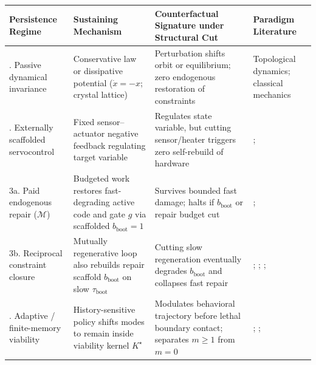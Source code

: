 \documentclass[11pt,a4paper]{article}
\newcounter{none}
\begin{document}
{\def\LTcaptype{none} %
\begin{longtable}[]{@{}
  >{\raggedright\arraybackslash}p{}
  >{\raggedright\arraybackslash}p{}
  >{\raggedright\arraybackslash}p{}
  >{\raggedright\arraybackslash}p{}@{}}
\toprule\noalign{}
\begin{minipage}[b]{\linewidth}\raggedright
Persistence Regime
\end{minipage} & \begin{minipage}[b]{\linewidth}\raggedright
Sustaining Mechanism
\end{minipage} & \begin{minipage}[b]{\linewidth}\raggedright
Counterfactual Signature under Structural Cut
\end{minipage} & \begin{minipage}[b]{\linewidth}\raggedright
Paradigm Literature
\end{minipage} \\
\midrule\noalign{}
\endhead
\bottomrule\noalign{}
\endlastfoot
1. Passive dynamical invariance & Conservative law or dissipative
potential (\(\dot{x}=-x\); crystal lattice) & Perturbation shifts orbit
or equilibrium; zero endogenous restoration of constraints & Topological
dynamics; classical mechanics \\
2. Externally scaffolded servocontrol & Fixed sensor--actuator negative
feedback regulating target variable & Regulates state variable, but
cutting sensor/heater triggers zero self-rebuild of hardware &
\citet{rosenblueth1943}; \citet{conantAshby1970} \\
3a. Paid endogenous repair (\(\mathcal{M}\)) & Budgeted work restores
fast-degrading active code and gate \(g\) via scaffolded
\(b_{\mathrm{boot}}=1\) & Survives bounded fast damage; halts if
\(b_{\mathrm{boot}}\) or repair budget cut & \citet{vonNeumann1966};
\citet{auWelshModrich1992} \\
3b. Reciprocal constraint closure & Mutually regenerative loop also
rebuilds repair scaffold \(b_{\mathrm{boot}}\) on slow
\(\tau_{\mathrm{boot}}\) & Cutting slow regeneration eventually degrades
\(b_{\mathrm{boot}}\) and collapses fast repair & \citet{kant1790};
\citet{varela1974}; \citet{rosen1991}; \citet{montevilMossio2015} \\
4. Adaptive / finite-memory viability & History-sensitive policy shifts
modes to remain inside viability kernel \(K^\star\) & Modulates
behavioral trajectory before lethal boundary contact; separates
\(m \ge 1\) from \(m=0\) & \citet{aubinCellina1984};
\citet{diPaolo2005}; \citet{bich2024} \\
\end{longtable}
}
\end{document}
